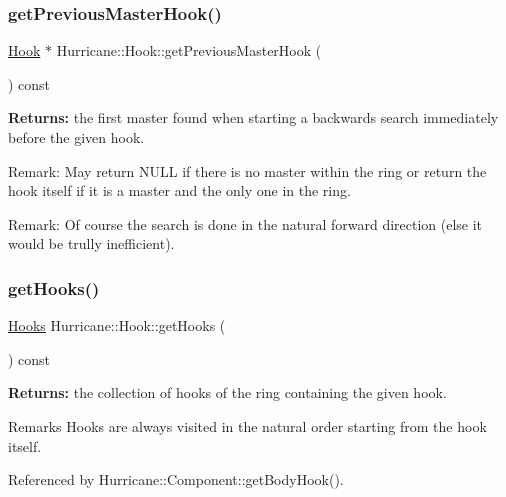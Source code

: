 \subsubsection{\texorpdfstring{get\+Previous\+Master\+Hook()}{getPreviousMasterHook()}}
{\footnotesize\ttfamily \hyperlink{classHurricane_1_1Hook}{Hook} $\ast$ Hurricane\+::\+Hook\+::get\+Previous\+Master\+Hook (\begin{DoxyParamCaption}{ }\end{DoxyParamCaption}) const}

{\bfseries Returns\+:} the first master found when starting a backwards search immediately before the given hook.

\begin{DoxyParagraph}{Remark\+:}
May return N\+U\+LL if there is no master within the ring or return the hook itself if it is a master and the only one in the ring.
\end{DoxyParagraph}
\begin{DoxyParagraph}{Remark\+:}
Of course the search is done in the natural forward direction (else it would be trully inefficient). 
\end{DoxyParagraph}
\mbox{\label{classHurricane_1_1Hook_a2def96fbcd444bebc16e589357c2a779}} 
\subsubsection{\texorpdfstring{get\+Hooks()}{getHooks()}}
{\footnotesize\ttfamily \hyperlink{namespaceHurricane_a9dcd9b74dc5e2b51bec7a13c25807e02}{Hooks} Hurricane\+::\+Hook\+::get\+Hooks (\begin{DoxyParamCaption}{ }\end{DoxyParamCaption}) const}

{\bfseries Returns\+:} the collection of hooks of the ring containing the given hook.

\begin{DoxyRemark}{Remarks}
Hooks are always visited in the natural order starting from the hook itself. 
\end{DoxyRemark}


Referenced by Hurricane\+::\+Component\+::get\+Body\+Hook().

\mbox{\label{classHurricane_1_1Hook_ad3c977e4f253a18cf24dfe4a6fd24cb1}} 
